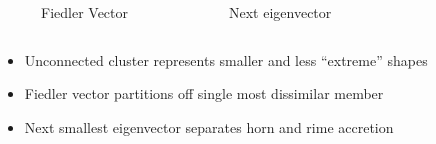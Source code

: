 \documentclass[9pt]{beamer}
\begin{document}
\begin{frame}
\begin{columns}[c]
\begin{figure}
      \caption{Fiedler Vector}
    \end{figure}
    \centering
    \vspace*{-0.0cm}\begin{figure}
      \caption{Next eigenvector}
    \end{figure}
\end{columns}
\begin{itemize}
\item Unconnected cluster represents smaller and less ``extreme'' shapes
\item Fiedler vector partitions off single most dissimilar member
\item Next smallest eigenvector separates horn and rime accretion
\end{itemize}
\end{frame}
\end{document}
